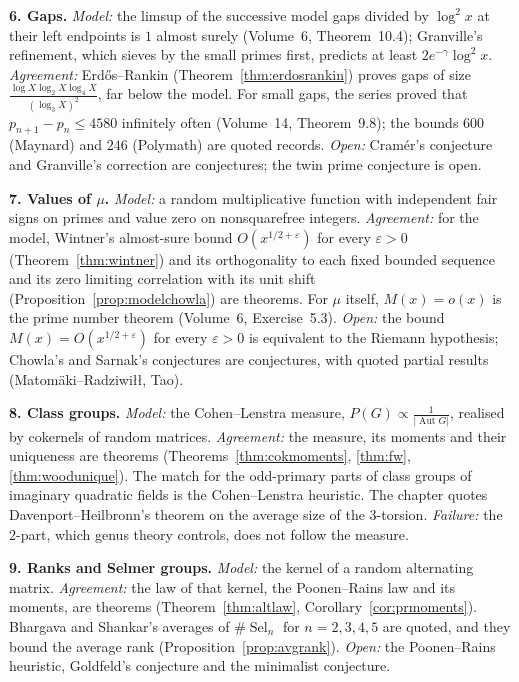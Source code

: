 \medskip\noindent\textbf{6. Gaps.} \emph{Model:} the limsup of the successive model gaps divided by $\log^2x$ at their left endpoints is $1$ almost surely (Volume~6, Theorem~10.4); Granville's refinement, which sieves by the small primes first, predicts at least $2e^{-\gamma}\log^2x$. \emph{Agreement:} Erd\H{o}s--Rankin (Theorem~\ref{thm:erdosrankin}) proves gaps of size $\frac{\log X\log_2X\log_4X}{(\log_3X)^2}$, far below the model. For small gaps, the series proved that $p_{n+1}-p_n\le4580$ infinitely often (Volume~14, Theorem~9.8); the bounds $600$ (Maynard) and $246$ (Polymath) are quoted records. \emph{Open:} Cram\'er's conjecture and Granville's correction are conjectures; the twin prime conjecture is open.

\medskip\noindent\textbf{7. Values of $\mu$.} \emph{Model:} a random multiplicative function with independent fair signs on primes and value zero on nonsquarefree integers. \emph{Agreement:} for the model, Wintner's almost-sure bound $O(x^{1/2+\varepsilon})$ for every $\varepsilon>0$ (Theorem~\ref{thm:wintner}) and its orthogonality to each fixed bounded sequence and its zero limiting correlation with its unit shift (Proposition~\ref{prop:modelchowla}) are theorems. For $\mu$ itself, $M(x)=o(x)$ is the prime number theorem (Volume~6, Exercise~5.3). \emph{Open:} the bound $M(x)=O(x^{1/2+\varepsilon})$ for every $\varepsilon>0$ is equivalent to the Riemann hypothesis; Chowla's and Sarnak's conjectures are conjectures, with quoted partial results (Matom\"aki--Radziwi\l\l, Tao).

\medskip\noindent\textbf{8. Class groups.} \emph{Model:} the Cohen--Lenstra measure, $P(G)\propto\frac1{|\operatorname{Aut}G|}$, realised by cokernels of random matrices. \emph{Agreement:} the measure, its moments and their uniqueness are theorems (Theorems~\ref{thm:cokmoments}, \ref{thm:fw}, \ref{thm:woodunique}). The match for the odd-primary parts of class groups of imaginary quadratic fields is the Cohen--Lenstra heuristic. The chapter quotes Davenport--Heilbronn's theorem on the average size of the $3$-torsion. \emph{Failure:} the $2$-part, which genus theory controls, does not follow the measure.

\medskip\noindent\textbf{9. Ranks and Selmer groups.} \emph{Model:} the kernel of a random alternating matrix. \emph{Agreement:} the law of that kernel, the Poonen--Rains law and its moments, are theorems (Theorem~\ref{thm:altlaw}, Corollary~\ref{cor:prmoments}). Bhargava and Shankar's averages of $\#\operatorname{Sel}_n$ for $n=2,3,4,5$ are quoted, and they bound the average rank (Proposition~\ref{prop:avgrank}). \emph{Open:} the Poonen--Rains heuristic, Goldfeld's conjecture and the minimalist conjecture.

